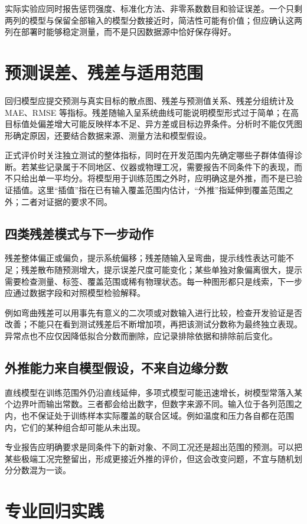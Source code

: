实际实验应同时报告惩罚强度、标准化方法、非零系数数目和验证误差。一个只剩两列的模型与保留全部输入的模型分数接近时，简洁性可能有价值；但应确认这两列在部署时能够稳定测量，而不是只因数据源中恰好保存得好。

\section{预测误差、残差与适用范围}
回归模型应提交预测与真实目标的散点图、残差与预测值关系、残差分组统计及 MAE、RMSE 等指标。残差随输入呈系统曲线可能说明模型形式过于简单；在高目标值处偏差增大可能反映样本不足、异方差或目标边界条件。分析时不能仅凭图形确定原因，还要结合数据来源、测量方法和模型假设。

正式评价时关注独立测试的整体指标，同时在开发范围内先确定哪些子群体值得诊断。若某些记录属于不同地区、仪器或物理工况，需要报告不同条件下的表现，而不只给出单一平均分。将模型用于训练范围之外时，应明确这是外推，而不是已验证插值。这里“插值”指在已有输入覆盖范围内估计，“外推”指延伸到覆盖范围之外；二者对证据的要求不同。

\subsection{四类残差模式与下一步动作}
残差整体偏正或偏负，提示系统偏移；残差随输入呈弯曲，提示线性表达可能不足；残差散布随预测增大，提示误差尺度可能变化；某些单独对象偏离很大，提示需要检查测量、标签、覆盖范围或稀有物理状态。每一种图形都只是线索，下一步应通过数据字段和对照模型检验解释。

例如弯曲残差可以用事先有意义的二次项或对数输入进行比较，检查开发验证是否改善；不能只在看到测试残差后不断增加项，再把该测试分数称为最终独立表现。异常点也不应仅因降低拟合分数而删除，应记录排除依据和排除前后变化。

\subsection{外推能力来自模型假设，不来自边缘分数}
直线模型在训练范围外仍沿直线延伸，多项式模型可能迅速增长，树模型常落入某个边界叶而输出常数。三者都会给出数字，但数字来源不同。输入位于各列范围之内，也不保证处于训练样本实际覆盖的联合区域。例如温度和压力各自都在范围内，它们的某种组合却可能从未出现。

专业报告应明确要求是同条件下的新对象、不同工况还是超出范围的预测。可以把某些极端工况完整留出，形成更接近外推的评价，但这会改变问题，不宜与随机划分分数混为一谈。

\section{专业回归实践}
